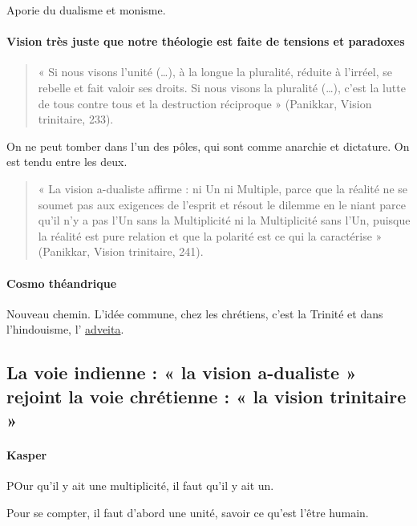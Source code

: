 \begin{Prop}
Aporie du dualisme et monisme.
\end{Prop}

\paragraph{Vision très juste que notre théologie est faite de tensions et paradoxes}
\begin{quote}
    « Si nous visons l’unité (…), à la longue la pluralité, réduite à l’irréel, se rebelle et fait valoir
ses droits. Si nous visons la pluralité (…), c’est la lutte de tous contre tous et la destruction
réciproque » (Panikkar, Vision trinitaire, 233).
\end{quote}
On ne peut tomber dans l'un des pôles, qui sont comme anarchie et dictature. On est tendu entre les deux.


    
\begin{quote}
« La vision a-dualiste affirme : ni Un ni Multiple, parce que la réalité ne se soumet pas aux 
exigences de l’esprit et résout le dilemme en le niant parce qu’il n’y a pas l’Un sans la 
Multiplicité ni la Multiplicité sans l’Un, puisque la réalité est pure relation et que la polarité 
est ce qui la caractérise » (Panikkar, Vision trinitaire, 241).

\end{quote}

\paragraph{Cosmo théandrique} Nouveau chemin. L'idée commune, chez les chrétiens, c'est la Trinité et dans l'hindouisme, l' \href{https://fr.wikipedia.org/wiki/Adva%C3%AFta_v%C3%A9danta}{adveita}. 

\subsection{La voie indienne : « la vision a-dualiste » rejoint la voie chrétienne : « la vision
trinitaire »}


 \paragraph{Kasper} POur qu'il y ait une multiplicité, il faut qu'il y ait un. 
 \begin{Ex}
     Pour se compter, il faut d'abord une unité, savoir ce qu'est l'être humain.
 \end{Ex}

